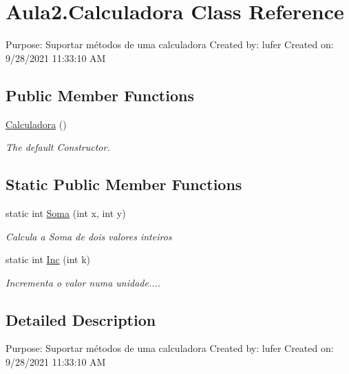 \hypertarget{class_aula2_1_1_calculadora}{}\section{Aula2.\+Calculadora Class Reference}
\label{class_aula2_1_1_calculadora}


Purpose\+: Suportar métodos de uma calculadora Created by\+: lufer Created on\+: 9/28/2021 11\+:33\+:10 AM  


\subsection*{Public Member Functions}
\begin{DoxyCompactItemize}
\item 
\mbox{\hyperlink{class_aula2_1_1_calculadora_a6d6cfb4679e09d5d6592bd40b879e3e2}{Calculadora}} ()
\begin{DoxyCompactList}\small\item\em The default Constructor. \end{DoxyCompactList}\end{DoxyCompactItemize}
\subsection*{Static Public Member Functions}
\begin{DoxyCompactItemize}
\item 
static int \mbox{\hyperlink{class_aula2_1_1_calculadora_ad9b0bc0e9294baabad8b90476df16216}{Soma}} (int x, int y)
\begin{DoxyCompactList}\small\item\em Calcula a Soma de dois valores inteiros \end{DoxyCompactList}\item 
static int \mbox{\hyperlink{class_aula2_1_1_calculadora_a752665de1ce52fd3ad3b1d6b23d7801c}{Inc}} (int k)
\begin{DoxyCompactList}\small\item\em Incrementa o valor numa unidade.... \end{DoxyCompactList}\end{DoxyCompactItemize}


\subsection{Detailed Description}
Purpose\+: Suportar métodos de uma calculadora Created by\+: lufer Created on\+: 9/28/2021 11\+:33\+:10 AM 



